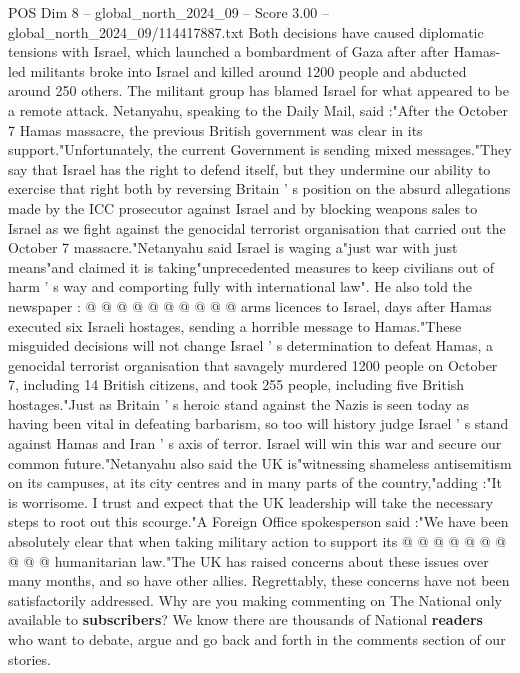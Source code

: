 \begin{textsample}{POS Dim 8 – global\_north\_2024\_09 – Score 3.00 – global\_north\_2024\_09/114417887.txt}  \label{ex:f8_pos_296}
Both decisions have caused diplomatic tensions with Israel, which launched a bombardment of Gaza after after Hamas-led militants broke into Israel and killed around 1200 people and abducted around 250 others.
The militant group has blamed Israel for what appeared to be a remote attack.
Netanyahu, speaking to the Daily Mail, said :"After the October 7 Hamas massacre, the previous British government was clear in its support."Unfortunately, the current Government is sending mixed messages."They say that Israel has the right to defend itself, but they undermine our ability to exercise that right both by reversing Britain ' s position on the absurd allegations made by the ICC prosecutor against Israel and by blocking weapons sales to Israel as we fight against the genocidal terrorist organisation that carried out the October 7 massacre."Netanyahu said Israel is waging a"just war with just means"and claimed it is taking"unprecedented measures to keep civilians out of harm ' s way and comporting fully with international law".
He also told the newspaper : @ @ @ @ @ @ @ @ @ @ arms licences to Israel, days after Hamas executed six Israeli hostages, sending a horrible message to Hamas."These misguided decisions will not change Israel ' s determination to defeat Hamas, a genocidal terrorist organisation that savagely murdered 1200 people on October 7, including 14 British citizens, and took 255 people, including five British hostages."Just as Britain ' s heroic stand against the Nazis is seen today as having been vital in defeating barbarism, so too will history judge Israel ' s stand against Hamas and Iran ' s axis of terror.
Israel will win this war and secure our common future."Netanyahu also said the UK is"witnessing shameless antisemitism on its campuses, at its city centres and in many parts of the country,"adding :"It is worrisome.
I trust and expect that the UK leadership will take the necessary steps to root out this scourge."A Foreign Office spokesperson said :"We have been absolutely clear that when taking military action to support its @ @ @ @ @ @ @ @ @ @ humanitarian law."The UK has raised concerns about these issues over many months, and so have other allies.
Regrettably, these concerns have not been satisfactorily addressed.
Why are you making commenting on The National only available to \textbf{subscribers}?
We know there are thousands of National \textbf{readers} who want to debate, argue and go back and forth in the comments section of our stories.

\end{textsample}
